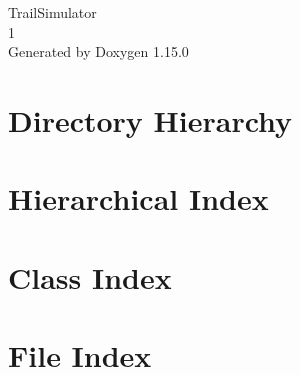 \documentclass[twoside]{book}
\newcommand{\+}{\discretionary{\mbox{\scriptsize$\hookleftarrow$}}{}{}}
\newcommand{\clearemptydoublepage}{%
    \newpage{\pagestyle{empty}\cleardoublepage}%
  }
\begin{document}
  \raggedbottom
    \hypersetup{pageanchor=false,
                bookmarksnumbered=true,
                pdfencoding=unicode
               }
  \begin{titlepage}
  \vspace*{7cm}
  \begin{center}%
  {\Large Trail\+Simulator}\\
  [1ex]\large 1 \\
  \vspace*{1cm}
  {\large Generated by Doxygen 1.15.0}\\
  \end{center}
  \end{titlepage}
  \clearemptydoublepage
  \tableofcontents
  \clearemptydoublepage
  \hypersetup{pageanchor=true}
\chapter{Directory Hierarchy}

\chapter{Hierarchical Index}

\chapter{Class Index}

\chapter{File Index}

\end{document}
